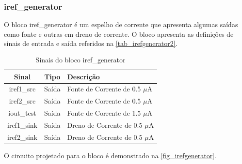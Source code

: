 \renewcommand{\NomeBloco}{iref\_generator}
\renewcommand{\NomeBlocoNoUnderline}{irefgenerator}
\renewcommand{\NomePTab}{tab_\NomeBlocoNoUnderline}
\renewcommand{\NomeSTab}{tab_\NomeBlocoNoUnderline2}
\renewcommand{\NomePFig}{fig_\NomeBlocoNoUnderline}
\renewcommand{\NomeSFig}{fig_\NomeBlocoNoUnderline2}
\renewcommand{\NomeTTab}{tab_\NomeBlocoNoUnderline3}
\renewcommand{\NomeQTab}{tab_\NomeBlocoNoUnderline4}

\subsubsection{\NomeBloco}

O bloco \NomeBloco{} \'e um espelho de corrente que apresenta algumas sa\'idas como fonte e outras em dreno de corrente. O bloco apresenta as defini{\c c}\~oes de sinais de entrada e sa\'ida referidos na \autoref{\NomeSTab}.

\begin{table}[htbp]
\caption{Sinais do bloco \NomeBloco}
\label{\NomeSTab}
\centering
\begin{tabular}{ccl}

    \toprule
    Sinal & Tipo    & Descri{\c c}\~ao        \\
    \midrule \midrule
    iref1\_src   & Saída   & Fonte de Corrente de 0.5 $\mu$A \\
    \midrule
    iref2\_src   & Saída   & Fonte de Corrente de 0.5 $\mu$A \\
    \midrule
    iout\_test   & Saída   & Fonte de Corrente de 1.5 $\mu$A \\
    \midrule
    iref1\_sink   & Saída   & Dreno de Corrente de 0.5 $\mu$A \\
    \midrule
    iref2\_sink   & Saída   & Dreno de Corrente de 0.5 $\mu$A \\
    \bottomrule
\end{tabular}
\end{table}

O circuito projetado para o bloco \'e demonstrado na \autoref{\NomePFig}.

